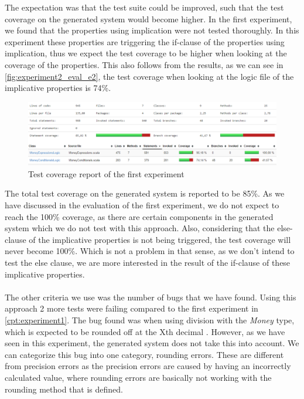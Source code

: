 The expectation was that the test suite could be improved, such that the test
coverage on the generated system would become higher. In the first experiment,
we found that the properties using implication were not tested thoroughly. In
this experiment these properties are triggering the if-clause of the properties
using implication, thus we expect the test coverage to be higher when looking at
the coverage of the properties. This also follows from the results, as we can
see in \autoref{fig:experiment2_eval_e2}, the test coverage when looking at the
logic file of the implicative properties is 74\%.
\FloatBarrier
\begin{figure}[!ht]
	\includegraphics[width=\linewidth]{figures/eval_experiment2}
\caption{Test coverage report of the first experiment}
\label{fig:experiment2_eval_e2}
\centering
\end{figure}
\FloatBarrier
The total test coverage on the generated system is reported to be 85\%. As we
have discussed in the evaluation of the first experiment, we do not expect to
reach the 100\% coverage, as there are certain components in the generated
system which we do not test with this approach. Also, considering that the
else-clause of the implicative properties is not being triggered, the test
coverage will never become 100\%. Which is not a problem in that sense, as we
don't intend to test the else clause, we are more interested in the result of
the if-clause of these implicative properties.\\
\\
The other criteria we use was the number of bugs that we have found. Using this
approach 2 more tests were failing compared to the first experiment in
\autoref{cpt:experiment1}. The bug found was when using division with the
\textit{Money} type, which is expected to be rounded off at the Xth decimal
. However, as we have seen in this experiment, the generated
system does not take this into account. We can categorize this bug into one
category, rounding errors. These are different from precision errors as the
precision errors are caused by having an incorrectly calculated value, where
rounding errors are basically not working with the rounding method that is
defined.

